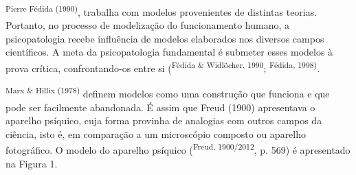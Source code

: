 \begin{multicols}{2}
\textsuperscript{Pierre Fédida (\allowbreak{}1990)\allowbreak{}},\allowbreak{} trabalha com modelos provenientes de distintas teorias.\allowbreak{} Portanto,\allowbreak{} no processo de modelização do funcionamento humano,\allowbreak{} a psicopatologia recebe influência de modelos elaborados nos diversos campos científicos.\allowbreak{} A meta da psicopatologia fundamental é submeter esses modelos à prova crítica,\allowbreak{} confrontando-\allowbreak{}os entre si (\allowbreak{}\textsuperscript{Fédida \&\allowbreak{\allowbreak{}\allowbreak{}}\allowbreak{} Widlöcher,\allowbreak{} 1990}; \textsuperscript{Fédida,\allowbreak{} 1998)\allowbreak{}}.\allowbreak{}\par{}\textsuperscript{Marx \&\allowbreak{\allowbreak{}\allowbreak{}}\allowbreak{} Hillix (\allowbreak{}1978)\allowbreak{}} definem modelos como uma construção que funciona e que pode ser facilmente abandonada.\allowbreak{} É assim que Freud (\allowbreak{}1900)\allowbreak{} apresentava o aparelho psíquico,\allowbreak{} cuja forma provinha de analogias com outros campos da ciência,\allowbreak{} isto é,\allowbreak{} em comparação a um microscópio composto ou aparelho fotográfico.\allowbreak{} O modelo do aparelho psíquico (\allowbreak{}\textsuperscript{Freud,\allowbreak{} 1900\fshyp{}2012},\allowbreak{} p.\allowbreak{} 569)\allowbreak{} é apresentado na Figura 1.\allowbreak{}\par{}
\par

\end{multicols}
